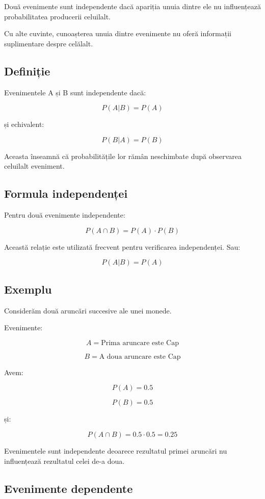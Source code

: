 \documentclass[12pt,a4paper]{article}
\begin{document}
Două evenimente sunt independente dacă apariția unuia dintre ele nu influențează probabilitatea producerii celuilalt.

Cu alte cuvinte, cunoașterea unuia dintre evenimente nu oferă informații suplimentare despre celălalt.

\subsection{Definiție}

Evenimentele A și B sunt independente dacă:

\[
P(A|B)=P(A)
\]

și echivalent:

\[
P(B|A)=P(B)
\]

Aceasta înseamnă că probabilitățile lor rămân neschimbate după observarea celuilalt eveniment.

\subsection{Formula independenței}

Pentru două evenimente independente:

\[
P(A \cap B)
=
P(A)\cdot P(B)
\]

Această relație este utilizată frecvent pentru verificarea independenței. Sau:

\[
P(A | B)
=
P(A)
\]

\subsection{Exemplu}

Considerăm două aruncări succesive ale unei monede.

Evenimente:

\[
A = \mbox{Prima aruncare este Cap}
\]

\[
B = \mbox{A doua aruncare este Cap}
\]

Avem:

\[
P(A)=0.5
\]

\[
P(B)=0.5
\]

și:

\[
P(A \cap B)
=
0.5 \cdot 0.5
=
0.25
\]

Evenimentele sunt independente deoarece rezultatul primei aruncări nu influențează rezultatul celei de-a doua.

\subsection{Evenimente dependente}
\end{document}

